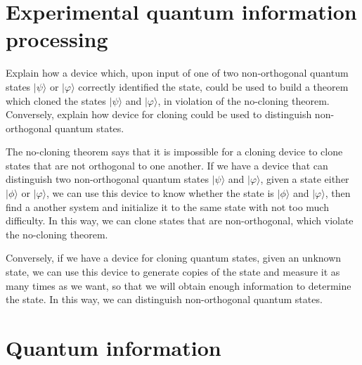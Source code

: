\documentclass[en]{sol-man}
\begin{document}
\section{Experimental quantum information processing}

\begin{exe}
    Explain how a device which, upon input of one of two non-orthogonal quantum states $\lvert\psi\rangle$ or $\lvert\varphi\rangle$ correctly identified the state, could be used to build a theorem which cloned the states $\lvert\psi\rangle$ and $\lvert\varphi\rangle$, in violation of the no-cloning theorem. Conversely, explain how device for cloning could be used to distinguish non-orthogonal quantum states.
\end{exe}
\begin{pf}
    The no-cloning theorem says that it is impossible for a cloning device to clone states that are not orthogonal to one another. If we have a device that can distinguish two non-orthogonal quantum states $\lvert\psi\rangle$ and $\lvert\varphi\rangle$, given a state either $\lvert\phi\rangle$ or $\lvert\varphi\rangle$, we can use this device to know whether the state is $\lvert\phi\rangle$ and $\lvert\varphi\rangle$, then find a another system and initialize it to the same state with not too much difficulty. In this way, we can clone states that are non-orthogonal, which violate the no-cloning theorem.

    Conversely, if we have a device for cloning quantum states, given an unknown state, we can use this device to generate copies of the state and measure it as many times as we want, so that we will obtain enough information to determine the state. In this way, we can distinguish non-orthogonal quantum states.
\end{pf}

\section{Quantum information}
\ifx\allfiles\undefined
\end{document}
